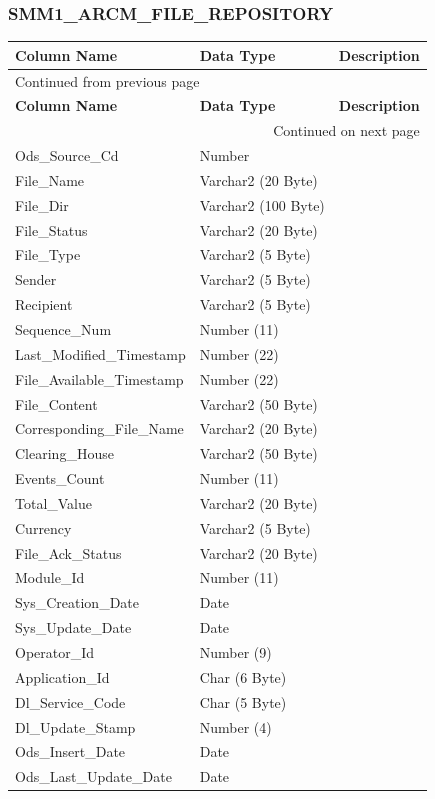 \documentclass[12pt,twoside]{article}
\begin{document}
\normalsize
\subsubsection{SMM1\_ARCM\_FILE\_REPOSITORY}
\label{sec:orgheadline127}
\footnotesize

\begin{longtable}{l|l|l}
\hline
\textbf{Column Name} & \textbf{Data Type} & \textbf{Description}\\
\hline
\endfirsthead
\multicolumn{3}{l}{Continued from previous page} \\
\hline

\textbf{Column Name} & \textbf{Data Type} & \textbf{Description} \\

\hline
\endhead
\hline\multicolumn{3}{r}{Continued on next page} \\
\endfoot
\endlastfoot
\hline
Ods\_Source\_Cd & Number & \\
File\_Name & Varchar2 (20 Byte) & \\
File\_Dir & Varchar2 (100 Byte) & \\
File\_Status & Varchar2 (20 Byte) & \\
File\_Type & Varchar2 (5 Byte) & \\
Sender & Varchar2 (5 Byte) & \\
Recipient & Varchar2 (5 Byte) & \\
Sequence\_Num & Number (11) & \\
Last\_Modified\_Timestamp & Number (22) & \\
File\_Available\_Timestamp & Number (22) & \\
File\_Content & Varchar2 (50 Byte) & \\
Corresponding\_File\_Name & Varchar2 (20 Byte) & \\
Clearing\_House & Varchar2 (50 Byte) & \\
Events\_Count & Number (11) & \\
Total\_Value & Varchar2 (20 Byte) & \\
Currency & Varchar2 (5 Byte) & \\
File\_Ack\_Status & Varchar2 (20 Byte) & \\
Module\_Id & Number (11) & \\
Sys\_Creation\_Date & Date & \\
Sys\_Update\_Date & Date & \\
Operator\_Id & Number (9) & \\
Application\_Id & Char (6 Byte) & \\
Dl\_Service\_Code & Char (5 Byte) & \\
Dl\_Update\_Stamp & Number (4) & \\
Ods\_Insert\_Date & Date & \\
Ods\_Last\_Update\_Date & Date & \\
\hline
\end{longtable}
\end{document}
